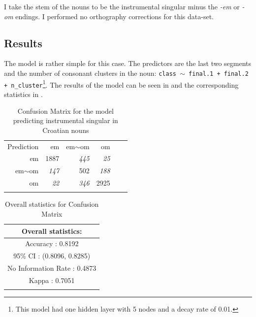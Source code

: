 I take the stem of the nouns to be the instrumental singular minus the \textit{-em} or \textit{-om} endings. I performed no orthography corrections for this data-set.

\subsection{Results}

The model is rather simple for this case. The predictors are the last two segments and the number of consonant clusters in the noun: \texttt{class $\sim$ final.1 + final.2 + n\_cluster}\footnote{This model had one hidden layer with 5 nodes and a decay rate of 0.01.}. The results of the model can be seen in  and the corresponding statistics in .

\begin{table}
  \centering
  \begin{tabular}{rrrrrr}
    \lsptoprule
    \multicolumn{4}{c}{Reference}                           \\
    \midrule
    Prediction & em           & em$\sim$om   & om           \\
    em         & 1887         & \emph{445} & \emph{25}  \\
    em$\sim$om & \emph{147} & 502          & \emph{188} \\
    om         & \emph{22}  & \emph{346} & 2925         \\
    \lspbottomrule
  \end{tabular}
  \caption{Confusion Matrix for the model predicting instrumental singular in Croatian nouns}\label{tab:ins-cro}
\end{table}

\begin{table}
  \centering
  \begin{tabular}{c}
    \lsptoprule
    Overall statistics:          \\
    \midrule
    Accuracy : 0.8192            \\
    95\% CI : (0.8096, 0.8285)   \\
    No Information Rate : 0.4873 \\
    Kappa : 0.7051               \\
    \lspbottomrule
  \end{tabular}
  \caption{Overall statistics for Confusion Matrix }\label{tab:ins-cro-stats}
\end{table}

